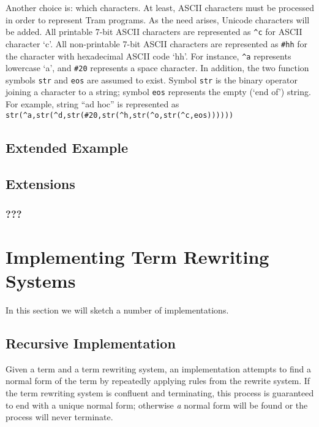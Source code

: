 \documentclass[11pt,twoside]{memoir}
\def\E{\emph} %
\def\T{\texttt}
\begin{document}
Another choice is: which characters. At least, ASCII characters must be processed in order to represent Tram programs. As the need arises, Unicode characters will be added.
All printable 7-bit ASCII characters are represented as \T{\^{}c} for ASCII character `c'. All non-printable 7-bit ASCII characters are represented as \T{\#hh} for the character with hexadecimal ASCII code `hh'. For instance, \T{\^{}a} represents lowercase `a', and \T{\#20} represents a space character.
In addition, the two function symbols \T{str} and \T{eos} are assumed to exist. Symbol \T{str} is the binary operator joining a character to a string; symbol \T{eos} represents the empty (`end of') string. For example, string ``ad hoc'' is represented as \T{str(\^{}a,str(\^{}d,str(\#20,str(\^{}h,str(\^{}o,str(\^{}c,eos))))))}
















\section{Extended Example}
\label{ch:ee}

\section{Extensions}
\label{ch:e}

\subsection{???}

\chapter{Implementing Term Rewriting Systems}
\label{ch:itrs}
In this section we will sketch a number of implementations.
\section{Recursive Implementation}
Given a term and a term rewriting system, an implementation attempts to find a normal form of the term by repeatedly applying rules from the rewrite system. If the term rewriting system is confluent and terminating, this process is guaranteed to end with a unique normal form; otherwise \E{a} normal form will be found or the process will never terminate.
\end{document}
